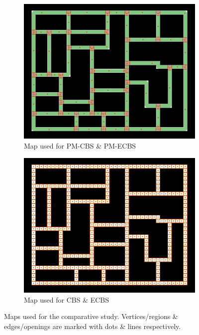 \documentclass[letterpaper, 10 pt, conference]{ieeeconf}  %
\begin{document}
\begin{figure}[b]
    \centering
    \begin{subfigure}[t]{.4\linewidth}
         \centering
         \includegraphics[width=\linewidth]{result/pmMap2.png}
         \caption{Map used for PM-CBS \& PM-ECBS}
         \label{fig:grid_map_PM}
    \end{subfigure}
    \begin{subfigure}[t]{.4\linewidth}
         \centering
         \includegraphics[width=\linewidth]{result/cbsMap2.png}
         \caption{Map used for CBS \& ECBS}
         \label{fig:grid_map_CBS}
    \end{subfigure}
    \caption{Maps used for the comparative study. Vertices/regions \& edges/openings are marked with dots \& lines respectively.}
    \label{fig:gridmap}
\end{figure}
\end{document}
